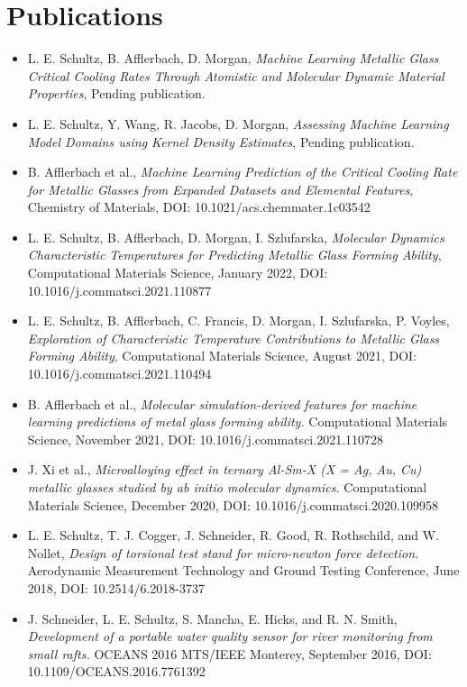 \section{Publications}

\begin{itemize}
    \item L. E. Schultz, B. Afflerbach,  D. Morgan, \textit{Machine Learning Metallic Glass Critical Cooling Rates Through Atomistic and Molecular Dynamic Material Properties}, Pending publication.
    \item L. E. Schultz, Y. Wang, R. Jacobs,  D. Morgan, \textit{Assessing Machine Learning Model Domains using Kernel Density Estimates}, Pending publication.
    \item B. Afflerbach et al., \textit{Machine Learning Prediction of the Critical Cooling Rate for Metallic Glasses from Expanded Datasets and Elemental Features}, Chemistry of Materials, DOI: 10.1021/acs.chemmater.1c03542
    \item L. E. Schultz, B. Afflerbach, D. Morgan, I. Szlufarska, \textit{Molecular Dynamics Characteristic Temperatures for Predicting Metallic Glass Forming Ability}, Computational Materials Science, January 2022, DOI: 10.1016/j.commatsci.2021.110877
    \item L. E. Schultz, B. Afflerbach, C. Francis, D. Morgan, I. Szlufarska, P. Voyles, \textit{Exploration of Characteristic Temperature Contributions to Metallic Glass Forming Ability}, Computational Materials Science, August 2021, DOI: 10.1016/j.commatsci.2021.110494
   \item B. Afflerbach et al., \textit{Molecular simulation-derived features for machine learning predictions of metal glass forming ability.} Computational Materials Science, November 2021, DOI: 10.1016/j.commatsci.2021.110728
    \item J. Xi et al., \textit{Microalloying effect in ternary Al-Sm-X (X = Ag, Au, Cu) metallic glasses studied by ab initio molecular dynamics.} Computational Materials Science, December 2020, DOI: 10.1016/j.commatsci.2020.109958
    \item L. E. Schultz, T. J. Cogger, J. Schneider, R. Good, R. Rothschild, and W. Nollet, \textit{Design of torsional test stand for micro-newton force detection.} Aerodynamic Measurement Technology and Ground Testing Conference, June 2018, DOI: 10.2514/6.2018-3737
    \item J. Schneider, L. E. Schultz, S. Mancha, E. Hicks, and R. N. Smith, \textit{Development of a portable water quality sensor for river monitoring from small rafts.} OCEANS 2016 MTS/IEEE Monterey, September 2016, DOI: 10.1109/OCEANS.2016.7761392
\end{itemize}